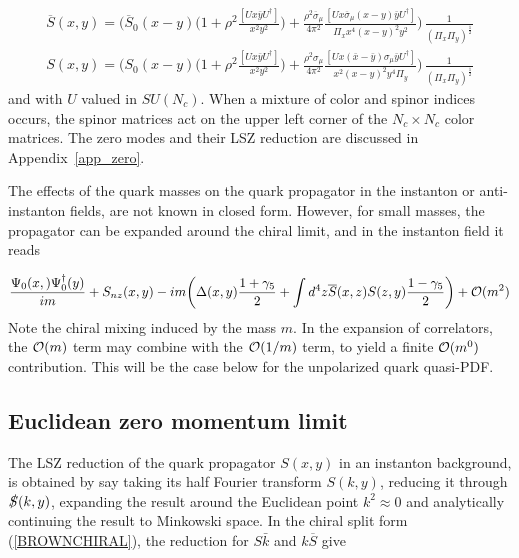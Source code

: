 \documentclass[11pt,aps,amsmath,amssymb,nofootinbib,notitlepage,longbibliography]{revtex4-1}
\newcommand{\be}{\begin{equation}}
\newcommand{\ee}{\end{equation}}
\begin{document}
\begin{eqnarray}
\label{BROWNCHIRAL}
\overline{S}(x,y)=\bigg(\overline{S}_0(x-y)\bigg(1+\rho^2\frac {[Ux\bar yU^\dagger]}{x^2y^2}\bigg)+\frac{\rho^2\overline{\sigma}_\mu}{4\pi^2}
\frac{[Ux\overline{\sigma}_\mu( x- y)\bar yU^\dagger]}{\Pi_xx^4(x-y)^2y^2}\bigg)\,\frac 1{(\Pi_x\Pi_y)^{\frac 12}} \nonumber\\
%
S(x,y)=\bigg(S_0(x-y)\bigg(1+\rho^2\frac {[Ux\bar yU^\dagger]}{x^2y^2}\bigg)+\frac{\rho^2\sigma_\mu}{4\pi^2}
\frac{[Ux(\bar x-\bar y)\sigma_\mu\bar yU^\dagger]}{x^2(x-y)^2y^4\Pi_y}\bigg)\,\frac 1{(\Pi_x\Pi_y)^{\frac 12}}
\end{eqnarray}
and with $U$ valued in $SU(N_c)$.
When a mixture of color and spinor indices occurs, the spinor matrices act on the upper left corner of the
$N_c\times N_c$ color matrices.  The zero modes and their LSZ reduction are discussed in Appendix~\ref{app_zero}.

The effects of the quark masses on the quark propagator in the instanton or anti-instanton fields, are  not known in closed form. However, for small masses, the propagator
can be expanded around the chiral limit, and in the instanton field it reads

\be
\label{MASS}
\frac{\Psi_0(x,)\Psi_0^\dagger(y)}{im}+S_{nz}(x,y)-im\bigg( \Delta(x,y){1+\gamma_5 \over 2}+\int d^4z\overline S(x,z)S(z,y){1-\gamma_5 \over 2}\bigg)+{\cal O}(m^2)
\ee
Note the chiral mixing induced by the mass $m$.
In the expansion of correlators, the ${\cal O}(m)$ term may combine with the ${\cal O}(1/m)$  term, to yield a
finite ${\cal O}(m^0)$ contribution. This will be the case below for the unpolarized quark quasi-PDF.











\subsection{Euclidean zero momentum limit}

The LSZ reduction of the quark propagator $S(x,y)$ in an instanton background, is obtained by
say taking its half  Fourier transform $S(k,y)$, reducing it through $\slashed S(k,y)$, expanding
the result around the Euclidean point $k^2\approx 0$  and analytically continuing the result to Minkowski
space. In the chiral split form (\ref{BROWNCHIRAL}),
the reduction for  $S\bar k$ and $k\overline S$ give~\cite{Moch:1996bs}
\end{document}
